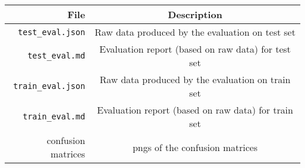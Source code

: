 \documentclass[
]{article}
\begin{document}
\begin{longtable}[]{@{}rc@{}}
\toprule
File & Description \\
\midrule
\endhead
\texttt{test\_eval.json} & Raw data produced by the evaluation on test
set \\
\texttt{test\_eval.md} & Evaluation report (based on raw data) for test
set \\
\texttt{train\_eval.json} & Raw data produced by the evaluation on train
set \\
\texttt{train\_eval.md} & Evaluation report (based on raw data) for
train set \\
confusion matrices & pngs of the confusion matrices \\
\bottomrule
\end{longtable}
\end{document}

